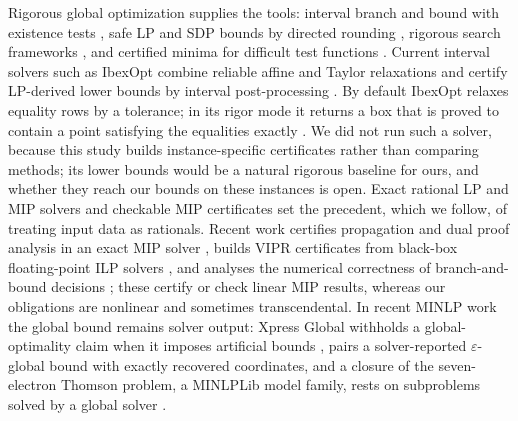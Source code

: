 Rigorous global optimization supplies the tools: interval branch and bound with existence tests \citep{kearfott2003-globsol-history-composition-and-advice,kearfott2011-interval-computations-rigour-and-non,neumaier2004-complete-search-in-continuous-global}, safe LP and SDP bounds by directed rounding \citep{neumaier2004-safe-bounds-in-linear-and,jansson2006-vsdp-verified-semidefinite-programming,jansson2007-rigorous-error-bounds-for-the}, rigorous search frameworks \citep{domes2009-gloptlab-a-configurable-framework-for}, and certified minima for difficult test functions \citep{vanaret2014-certified-global-minima-for-a}.
Current interval solvers such as IbexOpt combine reliable affine and Taylor relaxations and certify LP-derived lower bounds by interval post-processing \citep{araya2025-hybridizing-two-linear-relaxation-techniques}.
By default IbexOpt relaxes equality rows by a tolerance; in its rigor mode it returns a box that is proved to contain a point satisfying the equalities exactly \citep{ibex2026-ibexopt-ibex-documentation}.
We did not run such a solver, because this study builds instance-specific certificates rather than comparing methods; its lower bounds would be a natural rigorous baseline for ours, and whether they reach our bounds on these instances is open.
Exact rational LP and MIP solvers and checkable MIP certificates \citep{applegate2007-exact-solutions-to-linear-programming,cook2011-an-exact-rational-mixed-integer,cook2013-a-hybrid-branch-and-bound,cheung2017-verifying-integer-programming-results,eifler2023-a-computational-status-update-for} set the precedent, which we follow, of treating input data as rationals.
Recent work certifies propagation and dual proof analysis in an exact MIP solver \citep{borst2024-certified-constraint-propagation-and-dual}, builds VIPR certificates from black-box floating-point ILP solvers \citep{szeider2026-vipr-certificate-construction-from-black}, and analyses the numerical correctness of branch-and-bound decisions \citep{hoen2025-analyzing-the-numerical-correctness-of}; these certify or check linear MIP results, whereas our obligations are nonlinear and sometimes transcendental.
In recent MINLP work the global bound remains solver output: Xpress Global withholds a global-optimality claim when it imposes artificial bounds \citep{belotti2025-solving-minlps-to-global-optimality}, \citet{merx2026-from-computational-certification-to-exact} pairs a solver-reported $\varepsilon$-global bound with exactly recovered coordinates, and a closure of the seven-electron Thomson problem, a MINLPLib model family, rests on subproblems solved by a global solver \citep{kuznetsov2024-convexification-and-global-optimization-of}.

